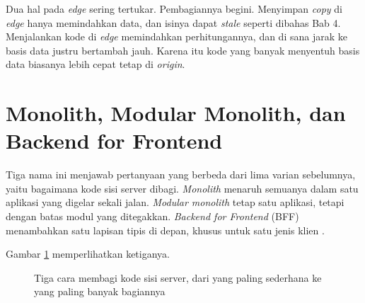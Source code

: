 Dua hal pada \textit{edge} sering tertukar. Pembagiannya begini. Menyimpan
\textit{copy} di \textit{edge} hanya memindahkan data, dan isinya dapat
\textit{stale} seperti dibahas Bab 4. Menjalankan kode di \textit{edge}
memindahkan perhitungannya, dan di sana jarak ke basis data justru bertambah
jauh. Karena itu kode yang banyak menyentuh basis data biasanya lebih cepat
tetap di \textit{origin}.

\section{Monolith, Modular Monolith, dan Backend for Frontend}

Tiga nama ini menjawab pertanyaan yang berbeda dari lima varian sebelumnya,
yaitu bagaimana kode sisi server dibagi. \textit{Monolith} menaruh semuanya
dalam satu aplikasi yang digelar sekali jalan. \textit{Modular monolith}
tetap satu aplikasi, tetapi dengan batas modul yang ditegakkan.
\textit{Backend for Frontend} (BFF) menambahkan satu lapisan tipis di depan,
khusus untuk satu jenis klien \cite{newman-bff}.

Gambar \ref{fig:bentuk-backend} memperlihatkan ketiganya.

\begin{figure}[!htb]
  \centering
  \caption{Tiga cara membagi kode sisi server, dari yang paling sederhana ke
           yang paling banyak bagiannya}
  \label{fig:bentuk-backend}
\end{figure}

